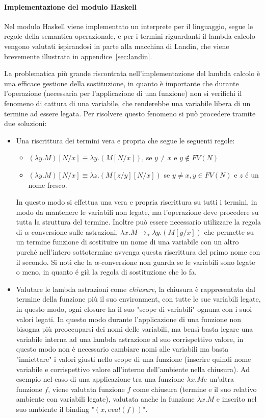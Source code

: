 \documentclass{article}
\newcommand{\lamb}[2]{\lambda #1 . #2}
\begin{document}
\paragraph{Implementazione del modulo Haskell}
Nel modulo Haskell viene implementato un interprete per il linguaggio, segue le regole della semantica operazionale, e per i termini riguardanti il lambda calcolo vengono valutati ispirandosi in parte alla macchina di Landin, che viene brevemente illustrata in appendice~\ref{sec:landin}.

La problematica più grande riscontrata nell'implementazione del lambda calcolo è una efficace gestione della sostituzione, in quanto è importante che durante l'operazione (necessaria per l'applicazione di una funzione) non si verifichi il fenomeno di cattura di una variabile, che renderebbe una variabile libera di un termine ad essere legata. 
Per risolvere questo fenomeno si può procedere tramite due soluzioni:
\begin{itemize}
\item Una riscrittura dei termini vera e propria che segue le seguenti regole:
\begin{itemize}
\item $ ( \lamb{y}{M} )[ N/x ] \equiv \lambda y.(M [N/x ]) $, se $y \neq x$ e $y \not\in FV(N)$
\item$ ( \lamb{y}{M} )[ N/x ] \equiv \lambda z.(M [z/y][N/x ])$ se $y \neq x,y \in FV(N)$ e $z$ é un nome fresco.
\end{itemize}
In questo modo si effettua una vera e propria riscrittura su tutti i termini, in modo da mantenere le variabili non legate, ma l'operazione deve procedere su tutta la struttura del termine. Inoltre può essere necessario utilizzare la regola di $\alpha$-conversione sulle astrazioni, $\lambda x .M \rightarrow_{\alpha} \lambda y. (M[y/x])$ che permette su un termine funzione  di sostituire un nome di una variabile con un altro purché nell'intero sottotermine avvenga questa riscrittura del primo nome con il secondo. Si noti che la $\alpha$-conversione non guarda se le variabili sono legate o meno, in quanto é già la regola di sostituzione che lo fa.
\item Valutare le lambda astrazioni come \emph{chiusure}, la chiusura è rappresentata dal termine della funzione più il suo environment, con tutte le sue variabili legate, in questo modo, ogni closure ha il suo "scope di variabili" ognuna con i suoi valori legati. In questo modo durante l'applicazione di una funzione non bisogna più preoccuparsi dei nomi delle variabili, ma bensì basta legare una variabile interna ad una lambda astrazione al suo corrispettivo valore, in questo modo non è necessario cambiare nomi alle variabili ma basta "inniettare" i valori giusti nello scope di una funzione (inserire quindi nome variabile e corrispettivo valore all'interno dell'ambiente nella chiusura). Ad esempio nel caso di una applicazione tra una funzione $\lamb{x}{M}$e un'altra funzione $f$, viene valutata funzione $f$ come chiusura (termine e il suo relativo ambiente con variabili legate), valutata anche la funzione $\lamb{x}{M}$ e inserito nel suo ambiente il binding "$(x, eval(f))$".
\end{itemize}
\end{document}
